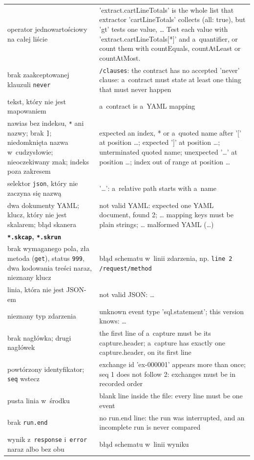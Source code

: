 {\begin{xltabular}{\linewidth}{@{}>{\raggedright\arraybackslash}p{4.6cm} >{\raggedright\arraybackslash}X@{}}
operator jednowartościowy na całej liście & 'extract.cartLineTotals' is the whole list that
extractor 'cartLineTotals' collects (all: true), but 'gt' tests one value, … Test each value
with 'extract.cartLineTotals[*]' and a~quantifier, or count them with countEquals,
countAtLeast or countAtMost. \\
brak zaakceptowanej klauzuli \texttt{never} & \texttt{/clauses}: the contract has no accepted
'never' clause: a~contract must state at least one thing that must never happen \\
tekst, który nie jest mapowaniem & a~contract is a~YAML mapping \\
nawias bez indeksu, \texttt{*} ani nazwy; brak \texttt{]}; niedomknięta nazwa w~cudzysłowie;
nieoczekiwany znak; indeks poza zakresem & expected an index, * or a~quoted name after '[' at
position …; expected ']' at position …; unterminated quoted name; unexpected '…' at position …;
index out of range at position … \\
selektor \texttt{json}, który nie zaczyna się nazwą & '…': a~relative path starts with a~name \\
dwa dokumenty YAML; klucz, który nie jest skalarem; błąd skanera & not valid YAML: expected one
YAML document, found 2; … mapping keys must be plain strings; … malformed YAML (…) \\
\midrule
\textbf{\texttt{*.skcap}, \texttt{*.skrun}} & \\
brak wymaganego pola, zła metoda (\texttt{get}), status \texttt{999}, dwa kodowania treści
naraz, nieznany klucz & błąd schematu w~linii zdarzenia, np. \texttt{line 2 /request/method} \\
linia, która nie jest JSON-em & not valid JSON: … \\
nieznany typ zdarzenia & unknown event type 'sql.statement'; this version knows: … \\
brak nagłówka; drugi nagłówek & the first line of a~capture must be its capture.header; a~capture has exactly one capture.header, on its first line \\
powtórzony identyfikator; \texttt{seq} wstecz & exchange id 'ex-000001' appears more than
once; seq 1 does not follow 2: exchanges must be in recorded order \\
pusta linia w~środku & blank line inside the file: every line must be one event \\
brak \texttt{run.end} & no run.end line: the run was interrupted, and an incomplete run is
never compared \\
wynik z~\texttt{response} i~\texttt{error} naraz albo bez obu & błąd schematu w~linii wyniku \\

\end{xltabular}}
